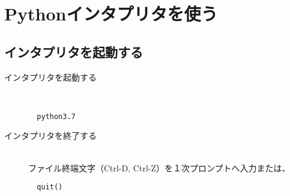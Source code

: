 \documentclass[a4paper,10.5pt]{jarticle}
\begin{document}
\section{Pythonインタプリタを使う}
\subsection{インタプリタを起動する}
\begin{description}
\item[インタプリタを起動する]~\\
\begin{verbatim}
  python3.7
\end{verbatim}
\item[インタプリタを終了する]~\\
ファイル終端文字（Ctrl-D, Ctrl-Z）を１次プロンプトへ入力または、
\begin{verbatim}
  quit()
\end{verbatim}
\end{description}
\end{document}
